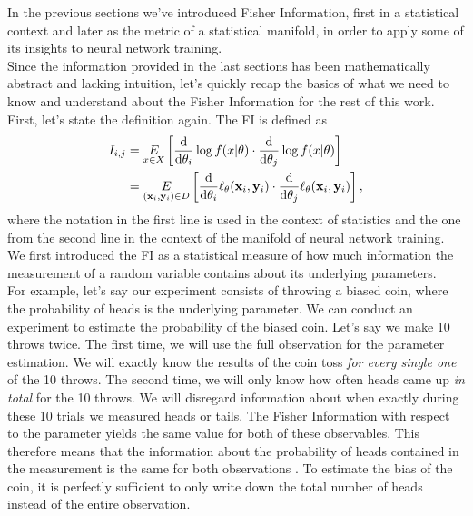 In the previous sections we've introduced Fisher Information, first in a statistical context and later as the metric of a statistical manifold, in order to apply some of its insights to neural network training.\\
Since the information provided in the last sections has been mathematically abstract and lacking intuition, let's quickly recap the basics of what we need to know and understand about the Fisher Information for the rest of this work.\\
First, let's state the definition again. The FI is defined as 
\begin{equation}
	\begin{split}
		I_{i,j} &= \underset{x \in X}{E} \left[\frac{\mathrm{d}}{\mathrm{d}\theta_i}\log f(x|\theta)\cdot \frac{\mathrm{d}}{\mathrm{d}\theta_j}\log f(x|\theta)\right]\\
		&= \underset{(\mathbf{x}_i,\mathbf{y}_i)\in D}{E} \left[\frac{\mathrm{d}}{\mathrm{d}\theta_i}\ell_\theta(\mathbf{x}_i,\mathbf{y}_i)\cdot \frac{\mathrm{d}}{\mathrm{d}\theta_j}\ell_\theta(\mathbf{x}_i,\mathbf{y}_i)\right],
	\end{split}
\end{equation}
where the notation in the first line is used in the context of statistics and the one from the second line in the context of the manifold of neural network training.\\
We first introduced the FI as a statistical measure of how much information the measurement of a random variable contains about its underlying parameters.\\
For example, let's say our experiment consists of throwing a biased coin, where the probability of heads is the underlying parameter. We can conduct an experiment to estimate the probability of the biased coin. Let's say we make 10 throws twice. The first time, we will use the full observation for the parameter estimation. We will exactly know the results of the coin toss \emph{for every single one} of the 10 throws. The second time, we will only know how often heads came up \emph{in total} for the 10 throws. We will disregard information about when exactly during these 10 trials we measured heads or tails. The Fisher Information with respect to the parameter yields the same value for both of these observables. This therefore means that the information about the probability of heads contained in the measurement is the same for both observations \cite{StatisticFisherInfoTutorial}. To estimate the bias of the coin, it is perfectly sufficient to only write down the total number of heads instead of the entire observation.\\
